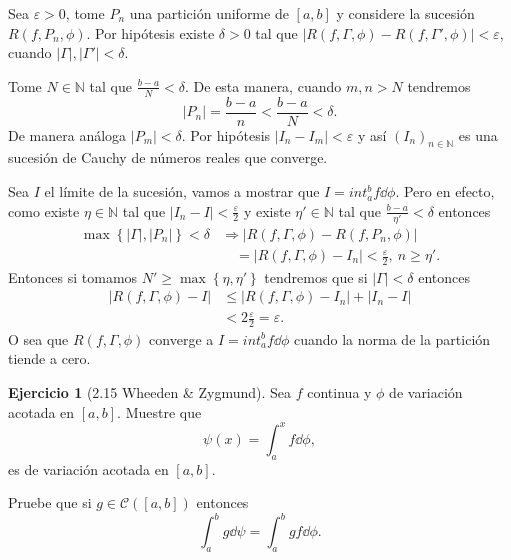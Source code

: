 \documentclass[12pt]{article}
\theoremstyle{plain}
\theoremstyle{definition}
\newtheorem{Ej}[Th]{Ejercicio}
\theoremstyle{remark}
\numberwithin{equation}{section}
\newcommand{\bN}{\mathbb{N}}        %
\newcommand{\cC}{\mathcal{C}}       %
\renewcommand{\geq}{\geqslant}      %
\renewcommand{\leq}{\leqslant}      %
\renewcommand{\:}{\colon}           %
\newcommand{\conj}[1]{\left\lbrace#1\right\rbrace}
\newcommand{\bonj}[1]{\left\lbrack#1\right\rbrack}
\begin{document}
\begin{multicols}{2}
\begin{ptcbp}
Sea $\varepsilon>0$, tome $P_n$ una partición uniforme de $\bonj{a,b}$ y considere la sucesión $R(f,P_n,\phi)$. Por hipótesis existe $\delta>0$ tal que $|R(f,\Gamma,\phi)-R(f,\Gamma',\phi)|<\varepsilon$,
  cuando $|\Gamma|,|\Gamma'|<\delta$. \par
  Tome $N\in\bN$ tal que $\frac{b-a}{N}<\delta$. De esta manera, cuando $m,n>N$ tendremos
  $$|P_n|=\frac{b-a}{n}<\frac{b-a}{N}<\delta.$$
  De manera análoga $|P_m|<\delta$. Por hipótesis $|I_n-I_m|<\varepsilon$ y así $(I_n)_{n\in\bN}$ es una sucesión de Cauchy de números reales que converge.\par
  Sea $I$ el límite de la sucesión, vamos a mostrar que $I=int_{a}^{b}f\dd\phi$. Pero en efecto, como existe $\eta\in\bN$ tal que $|I_n-I|<\frac{\varepsilon}{2}$ y existe $\eta'\in\bN$ tal que $\frac{b-a}{\eta'}<\delta$ entonces
  \begin{align*}
    \max\conj{|\Gamma|,|P_n|}<\delta &\Rightarrow |R(f,\Gamma,\phi)-R(f,P_n,\phi)|\\
    &\quad =|R(f,\Gamma,\phi)-I_n|<\frac{\varepsilon}{2},\ n\geq\eta'.
  \end{align*}
  Entonces si tomamos $N'\geq\max\conj{\eta,\eta'}$ tendremos que si $|\Gamma|<\delta$ entonces
  \begin{align*}
     |R(f,\Gamma,\phi)-I| &\leq |R(f,\Gamma,\phi)-I_n|+|I_n-I|\\
     &<2\frac{\varepsilon}{2}=\varepsilon.
  \end{align*}
 O sea que $R(f,\Gamma,\phi)$ converge a $I=int_{a}^{b}f\dd\phi$ cuando la norma de la partición tiende a cero.
\end{ptcbp}

\begin{Ej}[2.15  Wheeden \& Zygmund]
  Sea $f$ continua y $\phi$ de variación acotada en $\bonj{a,b}$. Muestre que $$\psi(x)=\int_{a}^{x}f\dd\phi,$$
  es de variación acotada en $\bonj{a,b}$.\par
  Pruebe que si $g\in\cC(\bonj{a,b})$ entonces
  $$\int_{a}^{b}g\dd\psi=\int_{a}^{b}gf\dd\phi.$$
\end{Ej}


\end{multicols}
\end{document}
